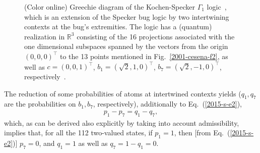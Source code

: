 \documentclass[%
  twocolumn,
 showpacs,
 showkeys,
 preprintnumbers,
 amsmath,amssymb,
 aps,
  pra,
  longbibliography,
 floatfix,
 ]{revtex4-1}
\begin{document}
\begin{figure}
\caption{\label{2017-b-f-gamma1} (Color online) Greechie diagram of the Kochen-Specker $\Gamma_1$ logic~\cite[p.~68]{kochen1},
which is an extension of the Specker bug logic by two intertwining contexts at the bug's extremities.
The logic has a (quantum) realization in $\mathbb{R}^3$
consisting of the 16 projections associated with the one dimensional subspaces
spanned by  the vectors from the origin $\left(0,0,0\right)^\intercal$ to
the 13 points mentioned in Fig.~\ref{2001-cesena-f2}, as well as
 $c          = \left(    0,0,1     \right)^\intercal $,
 $b_{1}     = \left(   \sqrt{2},1,0     \right)^\intercal $,
 $b_{7}     = \left(   \sqrt{2},-1,0     \right)^\intercal $,
respectively~\cite[p.~206, Fig.~1]{tkadlec-96}.
}
\end{figure}

The reduction of some probabilities of atoms at intertwined contexts yields ($q_1, q_7$ are the probabilities on $b_1, b_7$, respectively),
additionally to Eq.~(\ref{2015-s-e2}),
\begin{equation}
\begin{split}
p_1 - p_7 = q_1 - q_7
,
\end{split}
\label{2017-b-spa2l}
\end{equation}
which, as  can  be derived also explicitly by taking into account admissibility,
implies that, for all the 112 two-valued states, if $p_1=1$, then [from Eq.~(\ref{2015-s-e2})] $p_7=0$,
and $q_1=1$ as well as $q_7 = 1 - q_1 = 0$.
\end{document}

